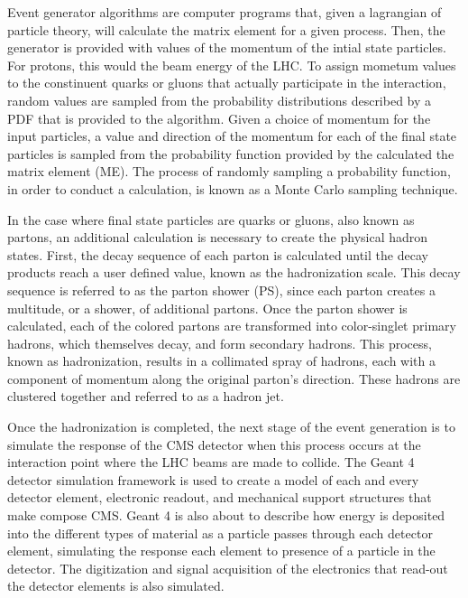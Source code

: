 \par Event generator algorithms are computer programs
that, given a lagrangian of particle theory, will calculate the
matrix element for a given process.  Then, the generator is provided
with values of the momentum of the intial state particles.  For
protons, this would the beam energy of the LHC.  To assign mometum
values to the constinuent quarks or gluons that actually participate
in the interaction, random values are sampled from the probability
distributions described by a PDF that is provided to the algorithm.
Given a choice of momentum for the input particles, a value and
direction of the momentum for each of the final state particles is
sampled from the probability function provided by the calculated the
matrix element (ME).  The process of randomly sampling a probability
function, in order to conduct a calculation, is known as a Monte Carlo
sampling technique.    

\par In the case where final state particles are quarks or gluons,
also known as partons, an additional calculation is necessary to
create the physical hadron states.  First, the decay sequence of each
parton is calculated until the decay products reach a user defined
value, known as the hadronization scale.  This decay sequence is
referred to as the parton shower (PS), since each parton creates a
multitude, or a shower, of additional partons.  Once the parton shower
is calculated, each of the colored partons are transformed into
color-singlet primary hadrons, which themselves decay, and form
secondary hadrons.  This process, known as hadronization, results in a
collimated spray of hadrons, each with a component of momentum along
the original parton's direction.  These hadrons are clustered together
and referred to as a hadron jet.   

\par Once the hadronization is completed, the next stage of the event
generation is to simulate the response of the CMS detector when this
process occurs at the interaction point where the LHC beams are made
to collide.  The Geant 4 detector simulation framework is used to
create a model of each and every detector element, electronic readout,
and mechanical support structures that make compose CMS.  Geant 4 is
also about to describe how energy is deposited into the different
types of material as a particle passes through each detector element,
simulating the response each element to presence of a particle in the
detector.  The digitization and signal acquisition of the electronics
that read-out the detector elements is also simulated.  

